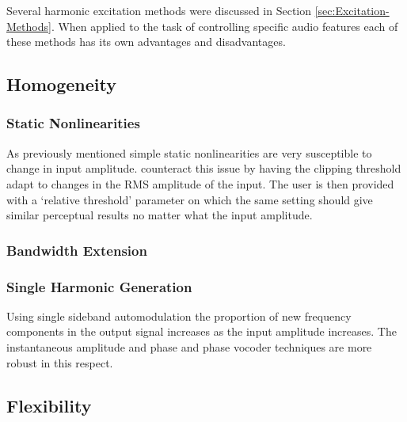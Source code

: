 
	Several harmonic excitation methods were discussed in Section \ref{sec:Excitation-Methods}. When applied to the task of controlling specific audio features each of these methods has its own advantages and disadvantages.

	\subsection{Homogeneity}
	\label{sec:FeatureControl-Homogeneity}

		\subsubsection*{Static Nonlinearities}		
			As previously mentioned simple static nonlinearities are very susceptible to change in input amplitude. \citet{deman2014adaptive} counteract this issue by having the clipping threshold adapt to changes in the RMS amplitude of the input. The user is then provided with a `relative threshold' parameter on which the same setting should give similar perceptual results no matter what the input amplitude.


		\subsubsection*{Bandwidth Extension}
			
		\subsubsection*{Single Harmonic Generation}
			Using single sideband automodulation the proportion of new frequency components in the output signal increases as the input amplitude increases. The instantaneous amplitude and phase and phase vocoder techniques are more robust in this respect.

	\subsection{Flexibility}
	\label{sec:FeatureControl-Flexibility}


